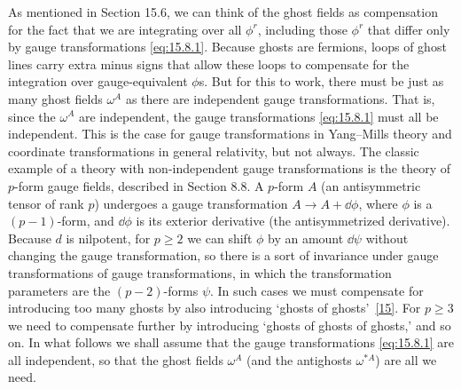 As mentioned in Section 15.6, we can think of the ghost fields as compensation for the fact that we are integrating over all $\phi^r$, including those $\phi^r$ that differ only by gauge transformations \eqref{eq:15.8.1}. Because ghosts are fermions, loops of ghost lines carry extra minus signs that allow these loops to compensate for the integration over gauge-equivalent $\phi$s. But for this to work, there must be just as many ghost fields $\omega^A$ as there are independent gauge transformations. That is, since the $\omega^A$ are independent, the gauge transformations \eqref{eq:15.8.1} must all be independent. This is the case for gauge transformations in Yang--Mills theory and coordinate transformations in general relativity, but not always. The classic example of a theory with non-independent gauge transformations is the theory of $p$-form gauge fields, described in Section 8.8. A $p$-form $A$ (an antisymmetric tensor of rank $p$) undergoes a gauge transformation $A\longrightarrow A+\dd\phi$, where $\phi$ is a $(p-1)$-form, and $\dd\phi$ is its exterior derivative (the antisymmetrized derivative). Because $d$ is nilpotent, for $p\geq2$ we can shift $\phi$ by an amount $\dd\psi$ without changing the gauge transformation, so there is a sort of invariance under gauge transformations of gauge transformations, in which the transformation parameters are the $(p-2)$-forms $\psi$. In such cases we must compensate for introducing too many ghosts by also introducing `ghosts of ghosts'~\hyperref[ch15-ref-15]{[15]}. For $p\geq3$ we need to compensate further by introducing `ghosts of ghosts of ghosts,' and so on. In what follows we shall assume that the gauge transformations \eqref{eq:15.8.1} are all independent, so that the ghost fields $\omega^A$ (and the antighosts $\omega^{*A}$) are all we need.

